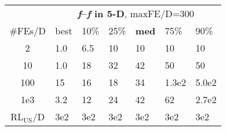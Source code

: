 \begin{tabular}{c|llllll}
 & \multicolumn{6}{|c}{\textbf{\textit{f}\raisebox{-0.35ex}{1}--\textit{f}\raisebox{-0.35ex}{24} in 5-D}, maxFE/D=300}\\
\#FEs/D & best & 10\% & 25\% & \textbf{med} & 75\% & 90\%\\
2 & \hspace*{1ex}1.0 & \hspace*{1ex}6.5 & 10 & 10 & 10 & 10\\
10 & \hspace*{1ex}1.0 & 18 & 32 & 42 & 50 & 50\\
100 & 15 & 16 & 18 & 34 & 1.3e2 & 5.0e2\\
1e3 & \hspace*{1ex}3.2 & 12 & 24 & 42 & 62 & 2.7e2\\
$\text{RL}_{\text{US}}$/D & 3e2 & 3e2 & 3e2 & 3e2 & 3e2 & 3e2
\end{tabular}
